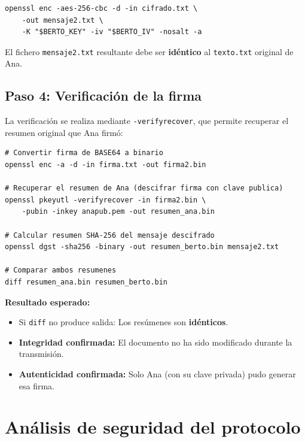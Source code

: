 \begin{lstlisting}[caption=Descifrado del documento por Berto]
openssl enc -aes-256-cbc -d -in cifrado.txt \
    -out mensaje2.txt \
    -K "$BERTO_KEY" -iv "$BERTO_IV" -nosalt -a
\end{lstlisting}

El fichero \texttt{mensaje2.txt} resultante debe ser \textbf{idéntico} al \texttt{texto.txt} original de Ana.

\subsection{Paso 4: Verificación de la firma}

La verificación se realiza mediante \texttt{-verifyrecover}, que permite recuperar el resumen original que Ana firmó:

\begin{lstlisting}[caption=Verificación de la firma digital]
# Convertir firma de BASE64 a binario
openssl enc -a -d -in firma.txt -out firma2.bin

# Recuperar el resumen de Ana (descifrar firma con clave publica)
openssl pkeyutl -verifyrecover -in firma2.bin \
    -pubin -inkey anapub.pem -out resumen_ana.bin

# Calcular resumen SHA-256 del mensaje descifrado
openssl dgst -sha256 -binary -out resumen_berto.bin mensaje2.txt

# Comparar ambos resumenes
diff resumen_ana.bin resumen_berto.bin
\end{lstlisting}

\textbf{Resultado esperado:}

\begin{itemize}[label=\textbullet]
    \item Si \texttt{diff} no produce salida: Los resúmenes son \textbf{idénticos}.
    \item \textbf{Integridad confirmada:} El documento no ha sido modificado durante la transmisión.
    \item \textbf{Autenticidad confirmada:} Solo Ana (con su clave privada) pudo generar esa firma.
\end{itemize}

\section{Análisis de seguridad del protocolo}

